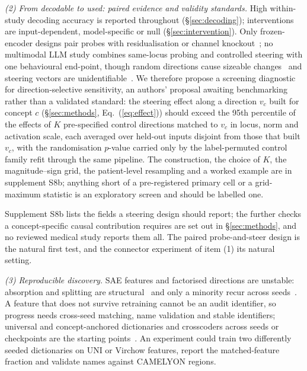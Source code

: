 \textit{(2) From decodable to used: paired evidence and validity standards.} High within-study decoding
accuracy is reported throughout (\S\ref{sec:decoding}); interventions are input-dependent, model-specific or null
(\S\ref{sec:intervention}). Only frozen-encoder designs pair probes with residualisation or channel
knockout~\cite{kim2026encoding,nooralahzadeh2026sparse}; no multimodal LLM study combines same-locus probing
and controlled steering with one behavioural end-point, though random directions cause sizeable
changes~\cite{korznikov2025the} and steering vectors are
unidentifiable~\cite{venkatesh2026nonident}. We therefore propose a screening diagnostic for direction-selective sensitivity, an authors'
proposal awaiting benchmarking rather than a validated standard: the steering effect along a direction
$v_c$ built for concept $c$ (\S\ref{sec:methods}, Eq.~(\ref{eq:effect})) should exceed the 95th
percentile of the effects of $K$ pre-specified control directions matched to $v_c$ in locus, norm and
activation scale, each averaged over held-out inputs disjoint from those that built $v_c$, with the
randomisation $p$-value carried only by the label-permuted control family refit through the same
pipeline. The construction, the choice of $K$, the magnitude--sign grid, the patient-level resampling
and a worked example are in supplement S8b; anything short of a pre-registered primary cell or a
grid-maximum statistic is an exploratory screen and should be labelled one.

Supplement S8b lists the fields a steering design should report; the further checks a concept-specific
causal contribution requires are set out in \S\ref{sec:methods}, and no reviewed medical study reports them
all. The paired probe-and-steer design is the natural first test, and the connector experiment of item (1)
its natural setting.

\textit{(3) Reproducible discovery.} SAE features and factorised directions are unstable: absorption and
splitting are structural~\cite{chanin2024a} and only a minority recur across
seeds~\cite{paulo2025sparse,sainsbury2026sparse}. A feature that does not survive retraining cannot be an audit identifier, so progress needs cross-seed
matching, name validation and stable identifiers; universal and concept-anchored dictionaries and crosscoders
across seeds or checkpoints are the starting
points~\cite{thasarathan2025universal,nasirisarvi2025sparc,minder2025overcoming}. An experiment could train two
differently seeded dictionaries on UNI or Virchow features, report the matched-feature fraction and validate
names against CAMELYON regions.

